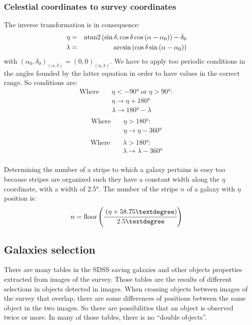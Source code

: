 \subsubsection{Celestial coordinates to survey coordinates}
%
The inverse transformation is in consequence:
\begin{eqnarray}
        \eta &=& \mathrm{atan2}\left(\sin\delta,\cos\delta\cos\left(\alpha-\alpha_0\right)\right)-\delta_0\nonumber\\
        \lambda &=& \arcsin\left(\cos\delta\sin\left(\alpha-\alpha_0\right)\right)\nonumber\\
\end{eqnarray}
with ${(\alpha_0,\delta_0)}_{(\alpha,\delta)}={(0,0)}_{(\eta,\lambda)}$. We
have to apply too periodic conditions in the angles founded by the latter
equation in order to have values in the correct range. So conditions are:
\begin{eqnarray}
        \mathrm{Where}&\;& \eta<-90°\;\mathrm{or}\; \eta>90°:\nonumber\\
        & & \eta\rightarrow\eta+180°\nonumber\\
        & & \lambda\rightarrow180°-\lambda\nonumber\\
\end{eqnarray}
\begin{eqnarray}
        \mathrm{Where}&\;& \eta>180°:\nonumber\\
        & & \eta\rightarrow\eta-360°\nonumber\\
\end{eqnarray}
\begin{eqnarray}
        \mathrm{Where}&\;& \lambda>180°:\nonumber\\
        & & \lambda\rightarrow\lambda-360°\nonumber\\
\end{eqnarray}

Determining the number of a stripe to which a galaxy pertains is easy too because stripes are organized such they have a constant
width along the $\eta$ coordinate, with a width of 2.5°. The number of the stripe $n$ of a galaxy with $\eta$ position is:
\begin{equation}
        n = \mathrm{floor}\pg\cfrac{\pg\eta+58.75°\pd}{2.5°}\pd
\end{equation}

\subsection{Galaxies selection}
There are many tables in the SDSS saving galaxies and other objects properties
extracted from images of the survey. Those tables are the results of different
selections in objects detected in images. When crossing objects between images
of the survey that overlap, there are some differences of positions between the
same object in the two images. So there are possibilities that an object is
observed twice or more. In many of those tables, there is no ``double objects''.

